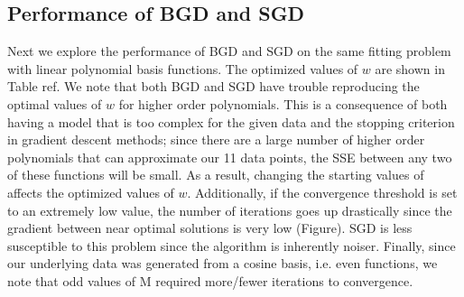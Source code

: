\documentclass[10pt]{article}
\begin{document}


\subsection{Performance of BGD and SGD}

Next we explore the performance of BGD and SGD on the same fitting problem with linear polynomial basis functions. The optimized values of $w$ are shown in Table {ref}. We note that both BGD and SGD have trouble reproducing the optimal values of $w$ for higher order polynomials. This is a consequence of both having a model that is too complex for the given data and the stopping criterion in gradient descent methods; since there are a large number of higher order polynomials that can approximate our 11 data points, the SSE between any two of these functions will be small. As a result, changing the starting values of affects the optimized values of $w$. Additionally, if the convergence threshold is set to an extremely low value, the number of iterations goes up drastically since the gradient between near optimal solutions is very low (Figure). SGD is less susceptible to this problem since the algorithm is inherently noiser. Finally, since our underlying data was generated from a cosine basis, i.e. even functions, we note that odd values of M required more/fewer iterations to convergence.
\end{document}
